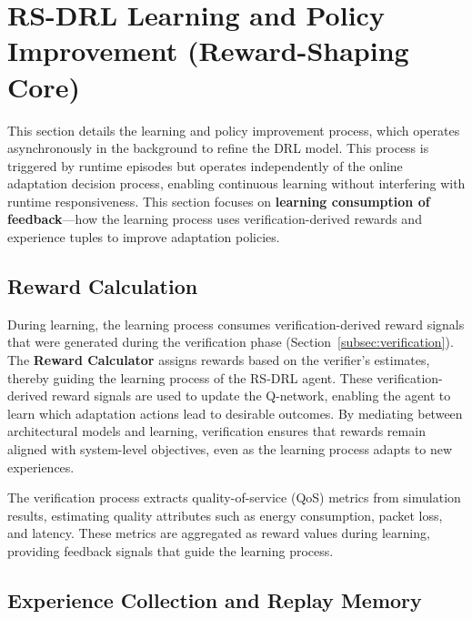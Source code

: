 \documentclass[11pt,a4paper]{article}
\begin{document}

\section{RS-DRL Learning and Policy Improvement (Reward-Shaping Core)}
\label{sec:learning}

This section details the learning and policy improvement process, which operates asynchronously in the background to refine the DRL model. This process is triggered by runtime episodes but operates independently of the online adaptation decision process, enabling continuous learning without interfering with runtime responsiveness. This section focuses on \textbf{learning consumption of feedback}---how the learning process uses verification-derived rewards and experience tuples to improve adaptation policies.

\subsection{Reward Calculation}
\label{subsec:reward-calculation}

During learning, the learning process consumes verification-derived reward signals that were generated during the verification phase (Section~\ref{subsec:verification}). The \textbf{Reward Calculator} assigns rewards based on the verifier's estimates, thereby guiding the learning process of the RS-DRL agent. These verification-derived reward signals are used to update the Q-network, enabling the agent to learn which adaptation actions lead to desirable outcomes. By mediating between architectural models and learning, verification ensures that rewards remain aligned with system-level objectives, even as the learning process adapts to new experiences.

The verification process extracts quality-of-service (QoS) metrics from simulation results, estimating quality attributes such as energy consumption, packet loss, and latency. These metrics are aggregated as reward values during learning, providing feedback signals that guide the learning process.

\subsection{Experience Collection and Replay Memory}
\label{subsec:experience-replay}
\end{document}
